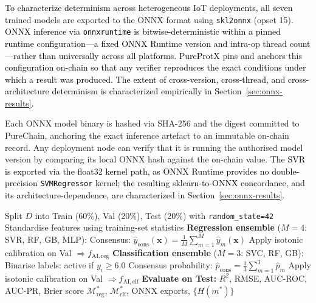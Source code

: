 \documentclass[conference]{IEEEtran}
\begin{document}
\textcolor{black}{To characterize determinism across heterogeneous IoT
deployments, all seven} trained models are exported to the ONNX format using
\texttt{skl2onnx} (opset 15).
\textcolor{black}{ONNX inference via \texttt{onnxruntime} is
bitwise-deterministic within a pinned runtime configuration---a
fixed ONNX Runtime version and intra-op thread count---rather
than universally across all platforms. PureProtX pins and
anchors this configuration on-chain so that any verifier
reproduces the exact conditions under which a result was
produced. The extent of cross-version, cross-thread, and
cross-architecture determinism is characterized empirically
in Section~\ref{sec:onnx-results}.}

Each ONNX model binary is hashed via SHA-256 and the digest
committed to PureChain, anchoring the exact inference
artefact to an immutable on-chain record.
Any deployment node can verify that it is running the
authorised model version by comparing its local ONNX hash
against the on-chain value.
\textcolor{black}{The SVR is exported via the float32 kernel path,
as ONNX Runtime provides no double-precision \texttt{SVMRegressor}
kernel; the resulting sklearn-to-ONNX concordance, and its
architecture-dependence, are characterized in
Section~\ref{sec:onnx-results}.}

\begin{algorithm}[!htbp]
\scriptsize
\caption{Consensus AI Ensemble Training}
\label{alg:ensemble}
Split $D$ into Train (60\%), Val (20\%), Test (20\%)
  with \texttt{random\_state=42}\;
Standardise features using training-set statistics\;
\BlankLine
\textbf{Regression ensemble} ($M = 4$: SVR, RF, GB, MLP):\;
Consensus: $\hat{y}_{\mathrm{cons}}(\mathbf{x})
  = \frac{1}{M}\sum_{m=1}^{M} \hat{y}_m(\mathbf{x})$\;
Apply isotonic calibration on Val
  $\Rightarrow f_{\mathrm{AI,reg}}$\;
\BlankLine
\textbf{Classification ensemble} ($M = 3$: SVC, RF, GB):\;
Binarise labels: active if $y_i \geq 6.0$\;
Consensus probability: $\hat{p}_{\mathrm{cons}}
  = \frac{1}{3}\sum_{m=1}^{3} \hat{p}_m$\;
Apply isotonic calibration on Val
  $\Rightarrow f_{\mathrm{AI,clf}}$\;
\BlankLine
\textbf{Evaluate on Test:}
  $R^2$, RMSE, AUC-ROC, AUC-PR, Brier score\;
\Return $\mathcal{M}_{\mathrm{reg}}^*$,
  $\mathcal{M}_{\mathrm{clf}}^*$,
  ONNX exports, $\{H(m^*)\}$\;
\end{algorithm}
\end{document}
